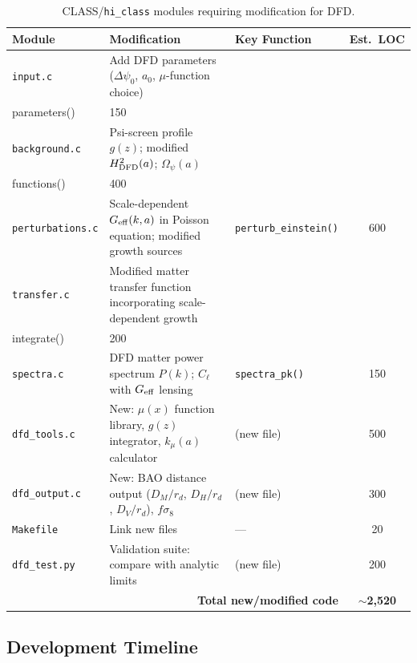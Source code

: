 \documentclass[11pt,a4paper]{article}
\newcommand{\kmu}{k_\mu}
\newcommand{\Geff}{G_{\rm eff}}
\newcommand{\hiclass}{\texttt{hi\_class}}
\begin{document}
\begin{table}[H]
\centering
\caption{CLASS/\hiclass{} modules requiring modification for DFD.}
\label{tab:modules}
\small
\begin{tabular}{p{3cm}p{4cm}p{3.5cm}c}
\toprule
\textbf{Module} & \textbf{Modification} & \textbf{Key Function} &
\textbf{Est.\ LOC} \\
\midrule
\texttt{input.c} & Add DFD parameters ($\Delta\psi_0$, $a_0$,
  $\mu$-function choice) & \texttt{input\_read\_\\parameters()} & 150 \\
\texttt{background.c} & Psi-screen profile $g(z)$; modified
  $H^2_{\rm DFD}(a)$; $\Omega_\psi(a)$ & \texttt{background\_\\functions()} & 400 \\
\texttt{perturbations.c} & Scale-dependent $\Geff(k,a)$ in Poisson
  equation; modified growth sources &
  \texttt{perturb\_einstein()} & 600 \\
\texttt{transfer.c} & Modified matter transfer function incorporating
  scale-dependent growth & \texttt{transfer\_\\integrate()} & 200 \\
\texttt{spectra.c} & DFD matter power spectrum $P(k)$; $C_\ell$
  with $\Geff$ lensing & \texttt{spectra\_pk()} & 150 \\
\texttt{dfd\_tools.c} & New: $\mu(x)$ function library, $g(z)$
  integrator, $\kmu(a)$ calculator & (new file) & 500 \\
\texttt{dfd\_output.c} & New: BAO distance output ($D_M/r_d$,
  $D_H/r_d$, $D_V/r_d$), $f\sigma_8$ & (new file) & 300 \\
\texttt{Makefile} & Link new files & --- & 20 \\
\texttt{dfd\_test.py} & Validation suite: compare with analytic
  limits & (new file) & 200 \\
\midrule
\multicolumn{3}{r}{\textbf{Total new/modified code}} & \textbf{$\sim$2,520} \\
\bottomrule
\end{tabular}
\end{table}

\subsection{Development Timeline}
\end{document}
